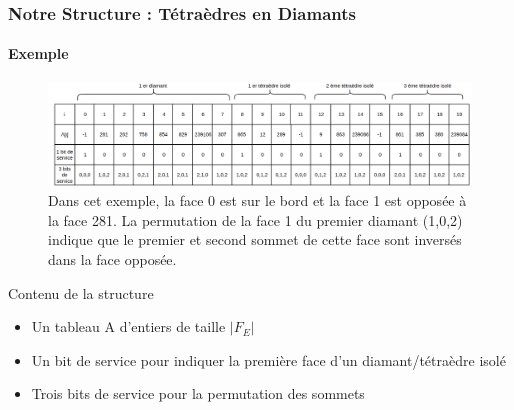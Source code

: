 \documentclass[9pt]{beamer}
\begin{document}
\begin{frame}
\small
\frametitle{Notre Structure : Tétraèdres en Diamants}
\framesubtitle{Exemple}
\begin{figure}[H]
\begin{center}
\includegraphics[scale=0.275]{Images/structure}
\caption{Dans cet exemple, la face 0 est sur le bord et la face 1 est opposée à la face 281. La permutation de la face 1 du premier diamant (1,0,2) indique que le premier et second sommet de cette face sont inversés dans la face opposée.}
\label{fig:structure}
\end{center}
\end{figure}

\begin{block}{Contenu de la structure}
\begin{itemize}
\item Un tableau A d'entiers de taille $|F_E|$
\item Un bit de service pour indiquer la première face d'un diamant/tétraèdre isolé
\item Trois bits de service pour la permutation des sommets
\end{itemize}
\end{block}





\end{frame}

%
\end{document}
